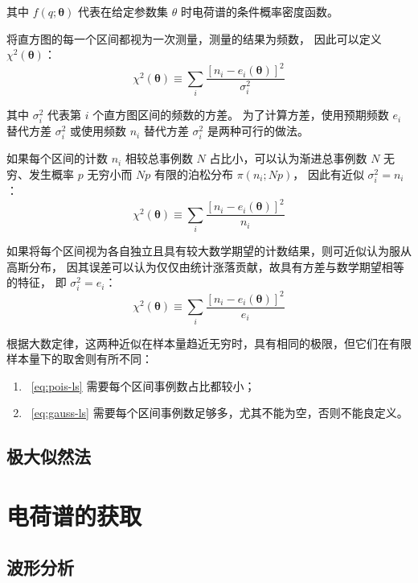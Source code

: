 其中 $f(q;\boldsymbol{\theta})$ 代表在给定参数集 $\theta$ 时电荷谱的条件概率密度函数。

将直方图的每一个区间都视为一次测量，测量的结果为频数，
因此可以定义 $\chi^2(\boldsymbol{\theta})$：
\begin{equation}
    \chi^2(\boldsymbol{\theta})\equiv\sum_{i}\frac{\left[n_i-e_i(\boldsymbol{\theta})\right]^2}{\sigma_i^2}
\end{equation}

其中 $\sigma_i^2$ 代表第 $i$ 个直方图区间的频数的方差。
为了计算方差，使用预期频数 $e_i$ 替代方差 $\sigma_i^2$ 或使用频数 $n_i$ 替代方差 $\sigma_i^2$ 是两种可行的做法。

如果每个区间的计数 $n_i$ 相较总事例数 $N$ 占比小，可以认为渐进总事例数 $N$ 无穷、发生概率 $p$ 无穷小而 $Np$ 有限的泊松分布 $\pi(n_i;Np)$，
因此有近似 $\sigma^2_i=n_i$：
\begin{equation}
    \chi^2(\boldsymbol{\theta})\equiv\sum_{i}\frac{\left[n_i-e_i(\boldsymbol{\theta})\right]^2}{n_i}
    \label{eq:pois-ls}
\end{equation}

如果将每个区间视为各自独立且具有较大数学期望的计数结果，则可近似认为服从高斯分布，
因其误差可以认为仅仅由统计涨落贡献，故具有方差与数学期望相等的特征，
即 $\sigma^2_i=e_i$：
\begin{equation}
    \chi^2(\boldsymbol{\theta})\equiv\sum_{i}\frac{\left[n_i-e_i(\boldsymbol{\theta})\right]^2}{e_i}
    \label{eq:gauss-ls}
\end{equation}

根据大数定律，这两种近似在样本量趋近无穷时，具有相同的极限，但它们在有限样本量下的取舍则有所不同：
\begin{enumerate}
    \item~\eqref{eq:pois-ls} 需要每个区间事例数占比都较小；
    \item~\eqref{eq:gauss-ls} 需要每个区间事例数足够多，尤其不能为空，否则不能良定义。
\end{enumerate}

\subsection{极大似然法}


\section{电荷谱的获取}

\subsection{波形分析}


